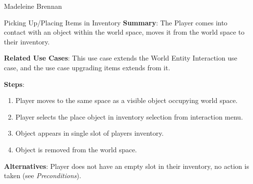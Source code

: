 \documentclass[12pt]{report}
\begin{document}
\begin{section}{Madeleine Brennan}
\begin{subsection}{Picking Up/Placing Items in Inventory}
\textbf{Summary}:
The Player comes into contact with an object within the world 
space, moves it from the world space to their inventory.

\textbf{Related Use Cases}:
This use case extends the World Entity Interaction use case, and the
use case upgrading items extends from it.

\textbf{Steps}:
\begin{enumerate}
\item Player moves to the same space as a visible object occupying world
	space.
\item Player selects the place object in inventory selection from 
	interaction menu.
\item Object appears in single slot of players inventory.
\item Object is removed from the world space.
\end{enumerate}

\textbf{Alternatives}:
Player does not have an empty slot in their inventory, no action is
taken (see \textit{Preconditions}).
\end{subsection}
\end{section}
\end{document}
